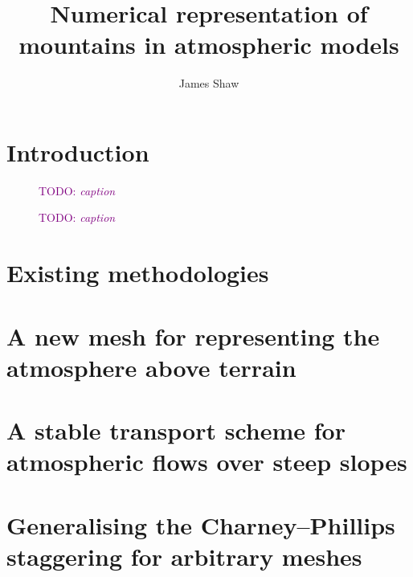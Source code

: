 \documentclass[a4paper,oneside]{memoir}
\title{Numerical representation of mountains in atmospheric models}
\author{James Shaw}
\date{\TODO{date}}
\newcommand{\TODO}[1]{\textcolor{purple}{TODO: \emph{#1}}}
\begin{document}
%


\frontmatter
\thispagestyle{plain}
\null\vfil
\begin{abstract}
\blindtext
\end{abstract}
\vfil

\cleardoublepage
{\hypersetup{linkcolor=black}\tableofcontents*}

\mainmatter
\chapter{Introduction}
\citep{schaer2002}

\begin{figure}
\centering

\caption{\TODO{caption}}
\end{figure}

\begin{figure}
\centering

\caption{\TODO{caption}}
\end{figure}


\chapter{Existing methodologies}
\chapter{A new mesh for representing the atmosphere above terrain}
\chapter{A stable transport scheme for atmospheric flows over steep slopes}
\chapter{Generalising the Charney–Phillips staggering for arbitrary meshes}
%
%

\backmatter


\end{document}
